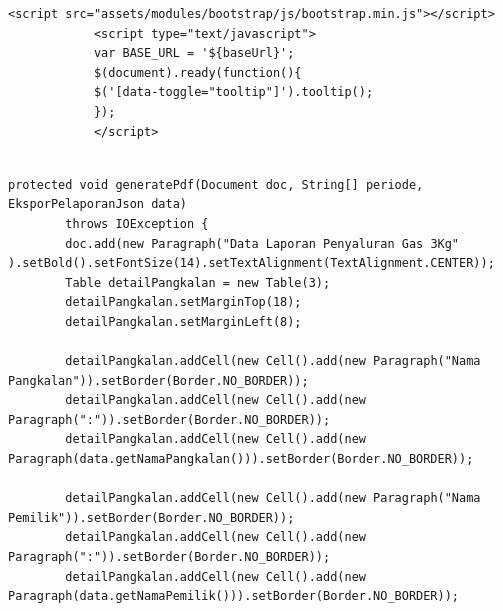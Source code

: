 \begin{enumerate}[a.]
	
		\begin{lstlisting}[caption=Potongan kode Login memakai email aplikasi berbasis web, label=loginWeb]
			<script src="assets/modules/bootstrap/js/bootstrap.min.js"></script>
			<script type="text/javascript">
			var BASE_URL = '${baseUrl}';
			$(document).ready(function(){
			$('[data-toggle="tooltip"]').tooltip();
			});
			</script>
		
		\end{lstlisting}
	
		\begin{lstlisting}[caption=Potongan kode ekspor data aplikasi berbasis web, label=eksporWeb]
		protected void generatePdf(Document doc, String[] periode, EksporPelaporanJson data) 
		throws IOException {
		doc.add(new Paragraph("Data Laporan Penyaluran Gas 3Kg" ).setBold().setFontSize(14).setTextAlignment(TextAlignment.CENTER));
		Table detailPangkalan = new Table(3);
		detailPangkalan.setMarginTop(18);
		detailPangkalan.setMarginLeft(8);
		
		detailPangkalan.addCell(new Cell().add(new Paragraph("Nama Pangkalan")).setBorder(Border.NO_BORDER));
		detailPangkalan.addCell(new Cell().add(new Paragraph(":")).setBorder(Border.NO_BORDER));
		detailPangkalan.addCell(new Cell().add(new Paragraph(data.getNamaPangkalan())).setBorder(Border.NO_BORDER));
		
		detailPangkalan.addCell(new Cell().add(new Paragraph("Nama Pemilik")).setBorder(Border.NO_BORDER));
		detailPangkalan.addCell(new Cell().add(new Paragraph(":")).setBorder(Border.NO_BORDER));
		detailPangkalan.addCell(new Cell().add(new Paragraph(data.getNamaPemilik())).setBorder(Border.NO_BORDER));
		

\end{lstlisting}
\end{enumerate}
